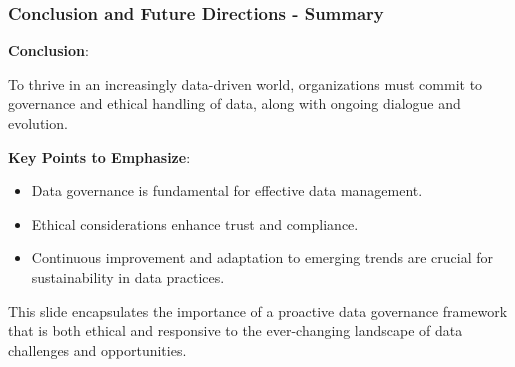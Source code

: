 \documentclass[aspectratio=169]{beamer}
\begin{document}
\begin{frame}[fragile]
    \frametitle{Conclusion and Future Directions - Summary}
    \textbf{Conclusion}:
    
    To thrive in an increasingly data-driven world, organizations must commit to governance and ethical handling of data, along with ongoing dialogue and evolution. 

    \textbf{Key Points to Emphasize}:
    \begin{itemize}
        \item Data governance is fundamental for effective data management.
        \item Ethical considerations enhance trust and compliance.
        \item Continuous improvement and adaptation to emerging trends are crucial for sustainability in data practices.
    \end{itemize}
    
    This slide encapsulates the importance of a proactive data governance framework that is both ethical and responsive to the ever-changing landscape of data challenges and opportunities.
\end{frame}
\end{document}
